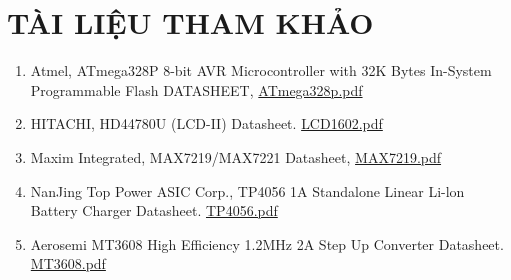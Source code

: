 \section{TÀI LIỆU THAM KHẢO}
\begin{enumerate}
    \item Atmel, ATmega328P 8-bit AVR Microcontroller with 32K Bytes In-System Programmable Flash DATASHEET, \href{https://ww1.microchip.com/downloads/en/DeviceDoc/Atmel-7810-Automotive-Microcontrollers-ATmega328P_Datasheet.pdf}{ATmega328p.pdf}
    \item HITACHI, HD44780U (LCD-II) Datasheet. \href{https://cdn.sparkfun.com/assets/9/5/f/7/b/HD44780.pdf}{LCD1602.pdf}
    \item Maxim Integrated, MAX7219/MAX7221 Datasheet, \href{https://www.analog.com/media/en/technical-documentation/data-sheets/MAX7219-MAX7221.pdf}{MAX7219.pdf}
    \item NanJing Top Power ASIC Corp., TP4056 1A Standalone Linear Li-lon Battery Charger Datasheet. \href{https://dlnmh9ip6v2uc.cloudfront.net/datasheets/Prototyping/TP4056.pdf}{TP4056.pdf}
    \item Aerosemi MT3608 High Efficiency 1.2MHz 2A Step Up Converter Datasheet. \href{https://www.olimex.com/Products/Breadboarding/BB-PWR-3608/resources/MT3608.pdf}{MT3608.pdf}
\end{enumerate}